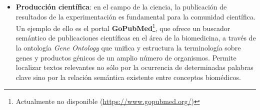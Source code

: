 \begin{itemize}
	\item %
	\textbf{Producción científica}: en el campo de la ciencia, la publicación de resultados de la experimentación es fundamental para la comunidad científica. Un ejemplo de ello es el portal \textbf{GoPubMed}\footnote{Actualmente no disponible (\url{https://www.gopubmed.org/})}, que ofrece un buscador semántico de publicaciones científicas en el área de la biomedicina, a través de la ontología \textit{Gene Ontology} que unifica y estructura la terminología sobre genes y productos génicos de un amplio número de organismos. Permite localizar textos relevantes no sólo por la ocurrencia de determinadas palabras clave sino por la relación semántica existente entre conceptos biomédicos. 
 
	
	

\end{itemize}
